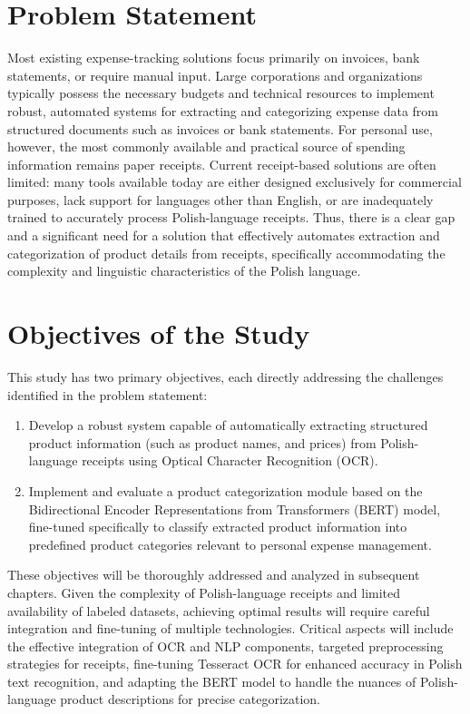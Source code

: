 \documentclass{SGGW-thesis-EN}
\begin{document}
\section{Problem Statement}
Most existing expense-tracking solutions focus primarily on invoices, bank statements, or require manual input. 
Large corporations and organizations typically possess the necessary budgets and technical resources to implement robust, 
automated systems for extracting and categorizing expense data from structured documents such as invoices or bank statements. 
For personal use, however, the most commonly available and practical source of spending information remains paper receipts. 
Current receipt-based solutions are often limited: many tools available today are either designed exclusively for commercial purposes, 
lack support for languages other than English, or are inadequately trained to accurately process Polish-language receipts.  
Thus, there is a clear gap and a significant need for a solution that effectively automates extraction and categorization of product details from receipts, 
specifically accommodating the complexity and linguistic characteristics of the Polish language.

\section{Objectives of the Study}
This study has two primary objectives, each directly addressing the challenges identified in the problem statement:

\begin{enumerate} 
  \item Develop a robust system capable of automatically extracting structured product information (such as product names, and prices) from Polish-language receipts using Optical Character Recognition (OCR).
  \item Implement and evaluate a product categorization module based on the Bidirectional Encoder Representations from Transformers (BERT) model, fine-tuned specifically to classify extracted product information into predefined product categories relevant to personal expense management.
\end{enumerate}

These objectives will be thoroughly addressed and analyzed in subsequent chapters. 
Given the complexity of Polish-language receipts and limited availability of labeled datasets, achieving optimal results will require careful integration and fine-tuning of multiple technologies. 
Critical aspects will include the effective integration of OCR and NLP components, targeted preprocessing strategies for receipts, 
fine-tuning Tesseract OCR for enhanced accuracy in Polish text recognition, 
and adapting the BERT model to handle the nuances of Polish-language product descriptions for precise categorization.
\end{document}
